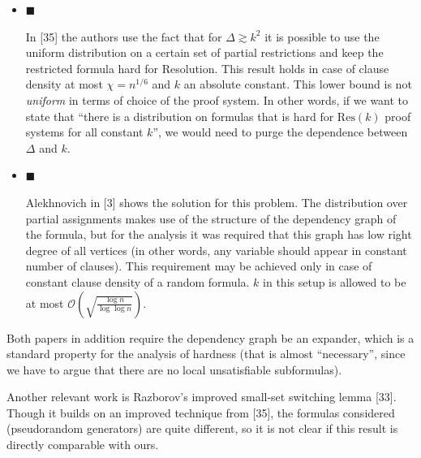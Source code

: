 \documentclass[10pt,a4paper]{article}
\begin{document}
\begin{itemize}


\item[] 
$\blacksquare$ 


In [35] the authors use the fact that for $\Delta\gtrsim k^{2}$ it is
possible to use the uniform distribution on a certain set of partial restrictions and keep
the restricted formula hard for Resolution. This result holds
in case of clause density at most $\chi=n^{1/6}$ and $k$ an absolute constant. This lower
bound is not \emph{uniform} in terms of choice of the proof system. In other words, if we want to
state that “there is a distribution on formulas that is hard for $\mathrm{Res}(k)$ proof systems for all
constant $k$”, we would need to purge the dependence between $\Delta$ and $k$.\par





\item[] 
$\blacksquare$ 


Alekhnovich in [3] shows the solution for this problem. The distribution over
partial assignments makes use of the structure of the dependency graph of the formula, but for the
analysis it was required that this graph has low right degree of all vertices (in other words, any
variable should appear in constant number of clauses). This requirement may be achieved only in
case of constant clause density of a random formula. $k$ in this setup is allowed to be at most
$\mathcal{O}\left(\sqrt{\frac{\log n}{\log\log n}}\right)$.\par





\end{itemize}


Both papers in addition require the dependency graph be an expander, which is a standard property for the
analysis of hardness (that is almost “necessary”, since we have to argue that there are no local
unsatisfiable subformulas).\par




Another relevant work is Razborov’s improved small-set switching lemma [33]. Though it builds
on an improved technique from [35], the formulas considered
(pseudorandom generators) are quite different, so it is not clear if this result is directly comparable
with ours.\par
\end{document}
